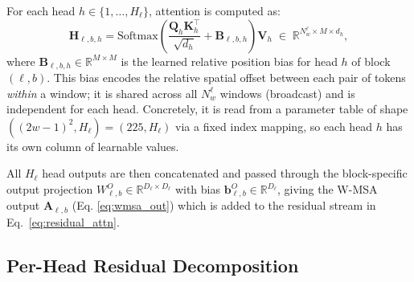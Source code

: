 For each head $h \in \{1,\ldots,H_\ell\}$, attention is computed as:
\begin{equation}
    \mathbf{H}_{\ell,b,h}
    = \mathrm{Softmax}\!\left(
        \frac{\mathbf{Q}_h \mathbf{K}_h^\top}{\sqrt{d_h}}
        + \mathbf{B}_{\ell,b,h}
      \right)\mathbf{V}_h
    \;\in\; \mathbb{R}^{N_w^\ell \times M \times d_h},
    \label{eq:attn}
\end{equation}
where $\mathbf{B}_{\ell,b,h} \in \mathbb{R}^{M \times M}$ is the learned
relative position bias for head $h$ of block $(\ell,b)$. This bias encodes
the relative spatial offset between each pair of tokens \emph{within} a
window; it is shared across all $N_w^\ell$ windows (broadcast) and is
independent for each head. Concretely, it is read from a parameter table of
shape $((2w-1)^2, H_\ell) = (225, H_\ell)$ via a fixed index mapping, so
each head $h$ has its own column of learnable values.

All $H_\ell$ head outputs are then concatenated and passed through the
block-specific output projection $W^O_{\ell,b} \in \mathbb{R}^{D_\ell\times D_\ell}$
with bias $\mathbf{b}^O_{\ell,b} \in \mathbb{R}^{D_\ell}$, giving the
W-MSA output $\mathbf{A}_{\ell,b}$ (Eq. \ref{eq:wmsa_out})
which is added to the residual stream in Eq.~\eqref{eq:residual_attn}.

\subsection{Per-Head Residual Decomposition}
\label{app:residual}

